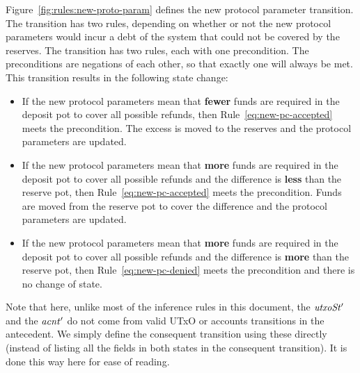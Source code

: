 Figure~\ref{fig:rules:new-proto-param} defines the new protocol parameter transition.
The transition has two rules, depending on whether or not the new protocol parameters
would incur a debt of the system that could not be covered by the reserves.
The transition has two rules, each with one precondition. The preconditions are
negations of each other, so that exactly one will always be met.
This transition results in the following state change:

\begin{itemize}
  \item If the new protocol parameters mean that \textbf{fewer} funds are required in the
    deposit pot to cover all possible refunds, then Rule~\ref{eq:new-pc-accepted} meets
    the precondition. The excess is moved to the reserves and the protocol parameters are updated.

  \item If the new protocol parameters mean that \textbf{more} funds are required in the
    deposit pot to cover all possible refunds and the difference is \textbf{less} than
    the reserve pot, then Rule~\ref{eq:new-pc-accepted} meets the precondition.  Funds are moved
    from the reserve pot to cover the difference and the protocol parameters are updated.

  \item If the new protocol parameters mean that \textbf{more} funds are required in the
    deposit pot to cover all possible refunds and the difference is \textbf{more} than
    the reserve pot, then Rule~\ref{eq:new-pc-denied} meets the precondition and there is no change of state.
\end{itemize}

Note that here, unlike most of the inference rules in this document,
the $\mathit{utxoSt'}$ and the $\mathit{acnt'}$ do not come from valid UTxO or
accounts transitions in the antecedent. We simply define the consequent
transition using these directly (instead of listing all the fields in both
states in the consequent transition). It is done this way here
for ease of reading.

